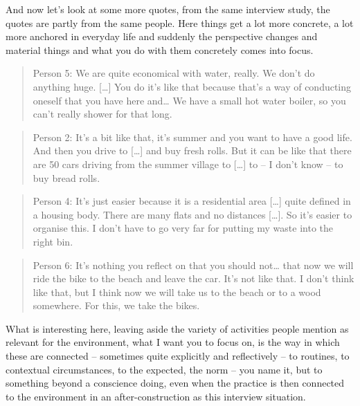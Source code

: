 \documentclass[a4paper,
fontsize=11pt,
oneside,
numbers=noperiodatend,
parskip=half-,
bibliography=totoc,
final
]{scrartcl}
\begin{document}
And now let's look at some more quotes, from the same interview study,
the quotes are partly from the same people. Here things get a lot more
concrete, a lot more anchored in everyday life and suddenly the
perspective changes and material things and what you do with them
concretely comes into focus.

\begin{quote}
Person 5: We are quite economical with water, really. We don't do
anything huge. {[}\ldots{}{]} You do it's like that because that's a way
of conducting oneself that you have here and\ldots{} We have a small hot
water boiler, so you can't really shower for that long.
\end{quote}

\begin{quote}
Person 2: It's a bit like that, it's summer and you want to have a good
life. And then you drive to {[}\ldots{}{]} and buy fresh rolls. But it
can be like that there are 50 cars driving from the summer village to
{[}\ldots{}{]} to -- I don't know -- to buy bread rolls.
\end{quote}

\begin{quote}
Person 4: It's just easier because it is a residential area
{[}\ldots{}{]} quite defined in a housing body. There are many flats and
no distances {[}\ldots{}{]}. So it's easier to organise this. I don't
have to go very far for putting my waste into the right bin.
\end{quote}

\begin{quote}
Person 6: It's nothing you reflect on that you should not\ldots{} that
now we will ride the bike to the beach and leave the car. It's not like
that. I don't think like that, but I think now we will take us to the
beach or to a wood somewhere. For this, we take the bikes.
\end{quote}

What is interesting here, leaving aside the variety of activities people
mention as relevant for the environment, what I want you to focus on, is
the way in which these are connected -- sometimes quite explicitly and
reflectively -- to routines, to contextual circumstances, to the
expected, the norm -- you name it, but to something beyond a conscience
doing, even when the practice is then connected to the environment in an
after-construction as this interview situation.
\end{document}
